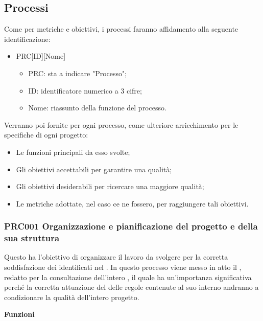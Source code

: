 \documentclass[../piano-di-qualifica.tex]{subfiles}
\begin{document}
\subsection{Processi}%
\label{sub:processi}
Come per metriche e obiettivi, i processi faranno affidamento alla seguente identificazione:
\begin{itemize}
    \item PRC[ID][Nome]
    \begin{itemize}
        \item PRC: sta a indicare "Processo";
        \item ID: identificatore numerico a 3 cifre;
        \item Nome: riassunto della funzione del processo.
    \end{itemize}
\end{itemize}
Verranno poi fornite per ogni processo, come ulteriore arricchimento per le specifiche di ogni progetto:
\begin{itemize}
    \item Le funzioni principali da esso svolte;
    \item Gli obiettivi accettabili per garantire una qualità;
    \item Gli obiettivi desiderabili per ricercare una maggiore qualità;
    \item Le metriche adottate, nel caso ce ne fossero, per raggiungere tali obiettivi.
\end{itemize}

\subsubsection{PRC001 Organizzazione e pianificazione del progetto e della sua struttura}%
\label{sub:organizzazione_e_pianificazione_del_progetto_e_della_sua_struttura}
Questo  ha l'obiettivo di organizzare il lavoro da svolgere per la corretta soddisfazione dei  identificati nel .
In questo processo viene messo in atto il , redatto per la consultazione dell'intero , il quale ha un'importanza significativa perché la corretta attuazione del delle regole contenute al suo interno andranno a condizionare la qualità dell'intero progetto.

\textbf{Funzioni}
\end{document}
